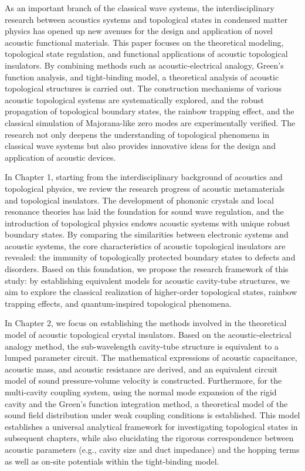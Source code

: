 \documentclass[
    anonymous,              %
    type = doctor,
  ]{njuthesis}
\begin{document}
\begin{abstract*}
  As an important branch of the classical wave systems, the interdisciplinary research between acoustics systems and topological states in condensed matter physics has opened up new avenues for the design and application of novel acoustic functional materials. This paper focuses on the theoretical modeling, topological state regulation, and functional applications of acoustic topological insulators. By combining methods such as acoustic-electrical analogy, Green's function analysis, and tight-binding model, a theoretical analysis of acoustic topological structures is carried out. The construction mechanisms of various acoustic topological systems are systematically explored, and the robust propagation of topological boundary states, the rainbow trapping effect, and the classical simulation of Majorana-like zero modes are experimentally verified. The research not only deepens the understanding of topological phenomena in classical wave systems but also provides innovative ideas for the design and application of acoustic devices.

  In Chapter 1, starting from the interdisciplinary background of acoustics and topological physics, we review the research progress of acoustic metamaterials and topological insulators. The development of phononic crystals and local resonance theories has laid the foundation for sound wave regulation, and the introduction of topological physics endows acoustic systems with unique robust boundary states. By comparing the similarities between electronic systems and acoustic systems, the core characteristics of acoustic topological insulators are revealed: the immunity of topologically protected boundary states to defects and disorders. Based on this foundation, we propose the research framework of this study: by establishing equivalent models for acoustic cavity-tube structures, we aim to explore the classical realization of higher-order topological states, rainbow trapping effects, and quantum-inspired topological phenomena.
  
  In Chapter 2, we focus on establishing the methods involved in the theoretical model of acoustic topological crystal insulators. Based on the acoustic-electrical analogy method, the sub-wavelength cavity-tube structure is equivalent to a lumped parameter circuit. The mathematical expressions of acoustic capacitance, acoustic mass, and acoustic resistance are derived, and an equivalent circuit model of sound pressure-volume velocity is constructed. Furthermore, for the multi-cavity coupling system, using the normal mode expansion of the rigid cavity and the Green's function integration method, a theoretical model of the sound field distribution under weak coupling conditions is established. This model establishes a universal analytical framework for investigating topological states in subsequent chapters, while also elucidating the rigorous correspondence between acoustic parameters (e.g., cavity size and duct impedance) and the hopping terms as well as on-site potentials within the tight-binding model.
  

\end{abstract*}
\end{document}
